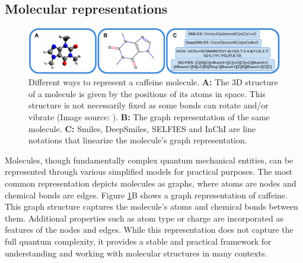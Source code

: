 \subsection{Molecular representations}
\begin{figure}
	\centering
	\includegraphics[width=\textwidth]{figures/representations/representations.pdf}
	\caption{Different ways to represent a caffeine molecule. \textbf{A:} The 3D structure of a
		molecule is given by the positions of its atoms in space. This structure is not
		necessarily fixed as some bonds can rotate and/or vibrate (Image source:
		\citep{Caffeine3DStructure2010}). \textbf{B:} The graph representation of the same
		molecule. \textbf{C:} Smiles, DeepSmiles, SELFIES and InChI are line notations that
		linearize the molecule's graph representation.\label{fig:molecular-graph}}
\end{figure}
Molecules, though fundamentally complex quantum mechanical entities, can be represented through
various simplified models for practical purposes. The most common representation depicts molecules
as graphs, where atoms are nodes and chemical bonds are edges. Figure \ref{fig:molecular-graph}B
shows a graph representation of caffeine. This graph structure captures the molecule's atoms
and chemical bonds between them. Additional properties such as atom type or charge are
incorporated as features of the nodes and edges. While this representation does not capture the full
quantum complexity, it provides a stable and practical framework for understanding and working with
molecular structures in many contexts.

